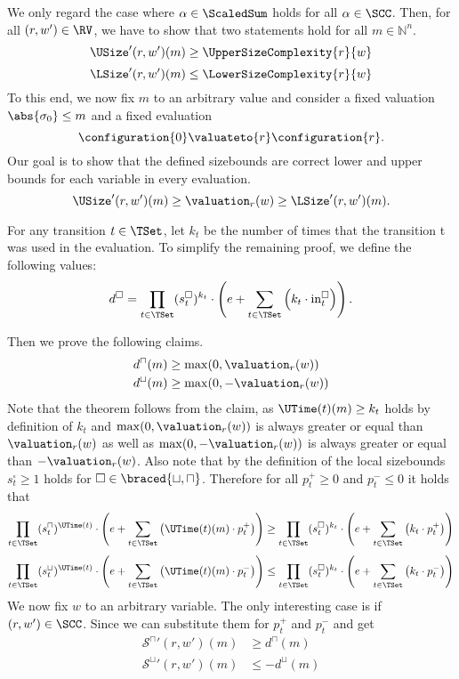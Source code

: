We only regard the case where $\alpha \in \ScaledSum$ holds for all $\alpha \in \SCC$.
Then, for all $(r, w') \in \RV$, we have to show that two statements hold for all $m \in \mathbb{N}^n$.
\[ \USize'(r, w')(m) \geq \UpperSizeComplexity{r}{w} \]
\[ \LSize'(r, w')(m) \leq \LowerSizeComplexity{r}{w} \]
To this end, we now fix $m$ to an arbitrary value and consider a fixed valuation $\abs{\sigma_0} \leq m$ and a fixed evaluation
\[ \configuration{0} \valuateto{r} \configuration{r}. \]
Our goal is to show that the defined sizebounds are correct lower and upper bounds for each variable in every evaluation.
\begin{equation} \label{eq:sizebound_target}
  \USize'(r, w')(m) \geq \valuation_r(w) \geq \LSize'(r, w')(m).
\end{equation}

For any transition $t \in \TSet$, let $k_t$ be the number of times that the transition t was used in the evaluation.
To simplify the remaining proof, we define the following values:
\[ d^\square = \prod_{t \in \TSet} (s^\square_t)^{k_t} \cdot \left( e + \sum_{t \in \TSet} \left( k_t \cdot \text{in}^\square_t \right) \right). \]

Then we prove the following claims.
\begin{equation} \label{eq:sizebound_hypothesis}
  \begin{split}
    d^\sqcap(m) & \geq \max(0, \valuation_r(w)) \\
    d^\sqcup(m) & \geq \max(0, -\valuation_r(w))
  \end{split}
\end{equation}
Note that the theorem follows from the claim, as $\UTime(t)(m) \geq k_t$ holds by definition of $k_t$ and $\max(0, \valuation_r(w))$ is always greater or equal than $\valuation_r(w)$ as well as $\max(0, -\valuation_r(w))$ is always greater or equal than $-\valuation_r(w)$.
Also note that by the definition of the local sizebounds $s^\square_t \geq 1$ holds for $\square \in \braced{\sqcup, \sqcap}$.
Therefore for all $p^+_t \geq 0$ and $p^-_t \leq 0$ it holds that
\[ \prod_{t \in \TSet} (s^\sqcap_t)^{\UTime(t)} \cdot \left( e + \sum_{t \in \TSet} \left( \UTime(t)(m) \cdot p^+_t \right) \right) \geq \prod_{t \in \TSet} (s^\square_t)^{k_t} \cdot \left( e + \sum_{t \in \TSet} \left( k_t \cdot p^+_t \right) \right) \]
\[ \prod_{t \in \TSet} (s^\sqcup_t)^{\UTime(t)} \cdot \left( e + \sum_{t \in \TSet} \left( \UTime(t)(m) \cdot p^-_t \right) \right) \leq \prod_{t \in \TSet} (s^\square_t)^{k_t} \cdot \left( e + \sum_{t \in \TSet} \left( k_t \cdot p^-_t \right) \right) \]
We now fix $w$ to an arbitrary variable.
The only interesting case is if $(r, w') \in \SCC$.
Since  we can substitute them for $p^+_t$ and $p^-_t$ and get
\begin{equation}
  \begin{split}
    {\mathcal{S}^\sqcap}'(r, w')(m) & \geq d^\sqcap(m) \\
    {\mathcal{S}^\sqcup}'(r, w')(m) & \leq -d^\sqcup(m)
  \end{split}
\end{equation}

